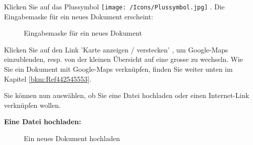 \begin{figure}[H]
\end{figure}

Klicken Sie auf das Plussymbol \texttt{[image: /Icons/Plussymbol.jpg]} . Die Eingabemaske für ein neues Dokument erscheint:

\begin{figure}[H]
\caption{Eingabemaske für ein neues Dokument}
\end{figure}

Klicken Sie auf den Link 'Karte anzeigen / verstecken' , um Google-Maps einzublenden, resp. von der kleinen Übersicht auf eine grosse zu wechseln. Wie Sie ein Dokument mit Google-Maps verknüpfen, finden Sie weiter unten im Kapitel \ref{bkm:Ref442545553}. \newline

Sie können nun auswählen, ob Sie eine Datei hochladen  oder einen Internet-Link verknüpfen  wollen.

\vspace{\baselineskip}

\textbf{Eine Datei hochladen:} 
\begin{figure}[H]
\caption{Ein neues Dokument hochladen}
\end{figure}

